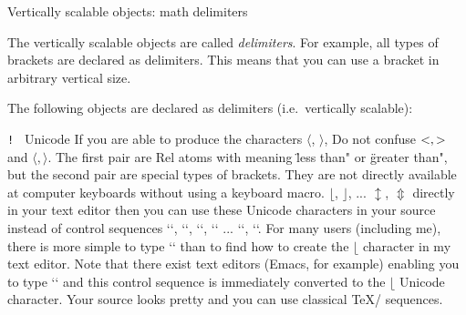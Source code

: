 \secc[delims] Vertically scalable objects: math delimiters 

The vertically scalable objects are called {\em delimiters}. For example,
all types of brackets are declared as delimiters.
This means that you can use a bracket in arbitrary
vertical size.

The following objects are declared as delimiters (i.e.\ vertically scalable):

\bigskip
{\tt \adef!{\bslash}
\medskip
{}
\medskip
{}}
\bigskip
\noindent \new Unicode
If you are able to produce the characters $\langle$, $\rangle$,\fnote
 {Do not confuse $\string<, >$ and $\langle, \rangle$. The first pair are Rel atoms
  with meaning \"less than" or \"greater than", but the second pair are special
  types of brackets. They are not directly available at computer keyboards without
  using a keyboard macro.}
$\lfloor$, $\rfloor$, ... $\updownarrow$, $\Updownarrow$ 
directly in your text editor then you can use these Unicode characters in your source instead of control
sequences `\langle`, `\rangle`, `\lfloor`, `\rfloor` ... `\updownarrow`, `\Updownarrow`.
For many users (including me), there is more simple to type `\lfloor` than to find
how to create the $\lfloor$ character in my text editor. Note that there exist 
text editors (Emacs, for example)
enabling you to type `\lfloor` and this control sequence is immediately
converted to the $\lfloor$ Unicode character. 
Your source looks pretty and you can use classical \TeX/ sequences.

